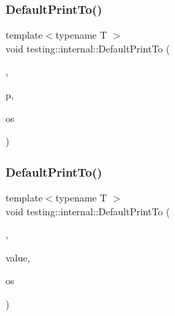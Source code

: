 \mbox{\label{namespacetesting_1_1internal_a7729c07abcae6c69b9b370c39db61409}} 
\subsubsection{\texorpdfstring{Default\+Print\+To()}{DefaultPrintTo()}\hspace{0.1cm}{\footnotesize\ttfamily [3/4]}}
{\footnotesize\ttfamily template$<$typename T $>$ \\
void testing\+::internal\+::\+Default\+Print\+To (\begin{DoxyParamCaption}\item[{\hyperlink{structtesting_1_1internal_1_1WrapPrinterType}{Wrap\+Printer\+Type}$<$ \hyperlink{namespacetesting_1_1internal_a17fb8f0125fa92404a249ed38a43faa4a5a066cde30e276c6460ba10d123d0c2c}{k\+Print\+Function\+Pointer} $>$}]{,  }\item[{T $\ast$}]{p,  }\item[{\+::std\+::ostream $\ast$}]{os }\end{DoxyParamCaption})}

\mbox{\label{namespacetesting_1_1internal_a72b1a69d96be8ea6382539f5c4fcac6d}} 
\subsubsection{\texorpdfstring{Default\+Print\+To()}{DefaultPrintTo()}\hspace{0.1cm}{\footnotesize\ttfamily [4/4]}}
{\footnotesize\ttfamily template$<$typename T $>$ \\
void testing\+::internal\+::\+Default\+Print\+To (\begin{DoxyParamCaption}\item[{\hyperlink{structtesting_1_1internal_1_1WrapPrinterType}{Wrap\+Printer\+Type}$<$ \hyperlink{namespacetesting_1_1internal_a17fb8f0125fa92404a249ed38a43faa4a6f88d77d9d763d8a009caf950cfbab28}{k\+Print\+Other} $>$}]{,  }\item[{const T \&}]{value,  }\item[{\+::std\+::ostream $\ast$}]{os }\end{DoxyParamCaption})}

